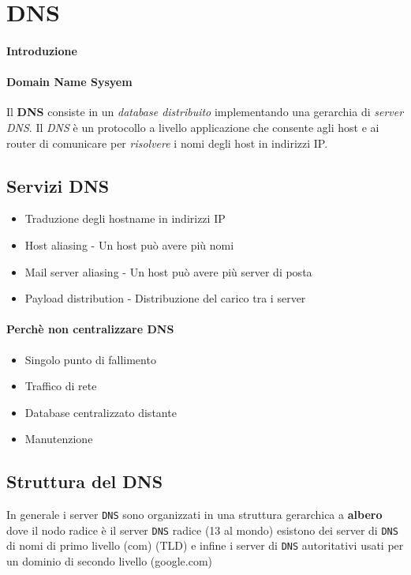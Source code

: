 \section{DNS}
    \paragraph{Introduzione}
        \paragraph{Domain Name Sysyem} Il \textbf{DNS} consiste in un \textit{database distribuito} implementando una gerarchia di \textit{server DNS}. Il \textit{DNS} è un protocollo a livello applicazione che consente agli host e ai router di comunicare per \textit{risolvere} i nomi degli host in indirizzi IP.
    \subsection{Servizi DNS}
        \begin{itemize}
            \item Traduzione degli hostname in indirizzi IP
            \item Host aliasing - Un host può avere più nomi
            \item Mail server aliasing - Un host può avere più server di posta
            \item Payload distribution - Distribuzione del carico tra i server
        \end{itemize}
        \paragraph{Perchè non centralizzare DNS}
        \begin{itemize}
            \item Singolo punto di fallimento
            \item Traffico di rete
            \item Database centralizzato distante
            \item Manutenzione
        \end{itemize}
    \subsection{Struttura del DNS}
        In generale i server \texttt{DNS} sono organizzati in una struttura gerarchica a \textbf{albero} dove il nodo radice è il server \texttt{DNS} radice (13 al mondo) esistono dei server di \texttt{DNS} di nomi di primo livello (com) (TLD) e infine i server di \texttt{DNS} autoritativi usati per un dominio di secondo livello (google.com)
